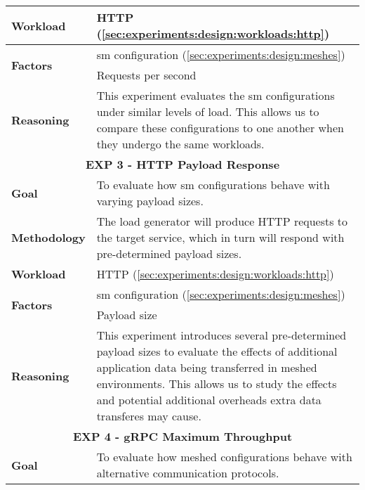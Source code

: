 \begin{table}[!t]
\begin{tabularx}{\textwidth}{l X}
        \textbf{Workload} 
        & HTTP (\cref{sec:experiments:design:workloads:http}) \\
        \midrule

        \multirow{2}{*}{\textbf{Factors}} 
        & \Gls{sm} configuration (\cref{sec:experiments:design:meshes}) \\
        & Requests per second \\
        \midrule
        
        \textbf{Reasoning}
        & This experiment evaluates the \gls{sm} configurations under similar levels of load. This allows us to compare these configurations to one another when they undergo the same workloads.  \\
        
        \toprule
        \multicolumn{2}{c}{\textbf{EXP 3 - HTTP Payload Response}}  \\
        \toprule
        
        \textbf{Goal}
        & To evaluate how \gls{sm} configurations behave with varying payload sizes. \\
        \midrule
        
        \textbf{Methodology}
        & The load generator will produce HTTP requests to the target service, which in turn will respond with pre-determined payload sizes.  \\
        \midrule
        
        \textbf{Workload} 
        & HTTP (\cref{sec:experiments:design:workloads:http}) \\
        \midrule

        \multirow{2}{*}{\textbf{Factors}} 
        & \Gls{sm} configuration (\cref{sec:experiments:design:meshes}) \\
        & Payload size \\
        \midrule
        
        \textbf{Reasoning}
        & This experiment introduces several pre-determined payload sizes to evaluate the effects of additional application data being transferred in meshed environments. This allows us to study the effects and potential additional overheads extra data transferes may cause. \\
        
        \toprule
        \multicolumn{2}{c}{\textbf{EXP 4 - gRPC Maximum Throughput}}  \\
        \toprule
        
        \textbf{Goal}
        & To evaluate how meshed configurations behave with alternative communication protocols. \\
        \midrule
        

\end{tabularx}
\end{table}
